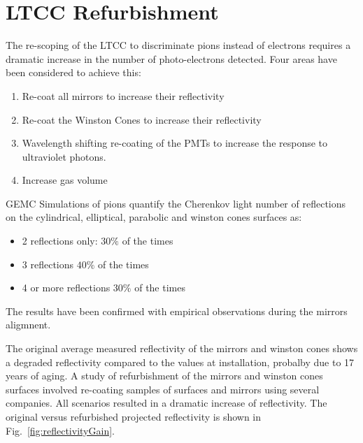 \section{LTCC Refurbishment}


The re-scoping of the LTCC to discriminate pions instead of electrons requires a dramatic increase in the
number of photo-electrons detected. Four areas have been considered to achieve this:

\begin{enumerate}
	\item Re-coat all mirrors to increase their reflectivity
	\item Re-coat the Winston Cones to increase their reflectivity
	\item Wavelength shifting re-coating of the PMTs to increase the response to ultraviolet photons.
	\item Increase gas volume
\end{enumerate}


GEMC Simulations of pions quantify the Cherenkov light number of reflections on the cylindrical, elliptical,
parabolic and winston cones surfaces as:

\begin{itemize}
	\item 2 reflections only: $30\%$ of the times
	\item 3 reflections $40\%$ of the times
	\item 4 or more reflections $30\%$ of the times
\end{itemize}

The results have been confirmed with empirical observations during the mirrors aligmnent.

The original average measured reflectivity of the mirrors and winston cones
shows a degraded reflectivity compared to the values at installation, probalby due to
17 years of aging. A study of refurbishment of the mirrors and winston cones surfaces
involved re-coating samples of surfaces and mirrors using several companies.
All scenarios resulted in a dramatic increase of reflectivity. The original versus refurbished projected
reflectivity is shown in Fig.~\ref{fig:reflectivityGain}.

